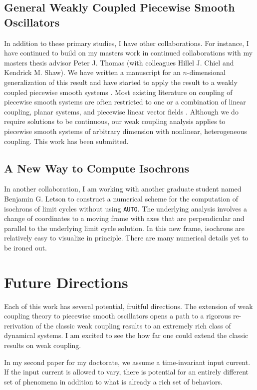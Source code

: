 \documentclass[a4paper,11pt]{article}
\begin{document}
\subsection{General Weakly Coupled Piecewise Smooth Oscillators}
In addition to these primary studies, I have other collaborations. For instance, I have continued to build on my masters work in continued collaborations with my masters thesis advisor Peter J. Thomas (with colleagues Hillel J. Chiel and Kendrick M. Shaw). We have written a manuscript for an $n$-dimensional generalization of this result and have started to apply the result to a weakly coupled piecewise smooth systems \cite{park2016infinitesimal}. Most existing literature on coupling of piecewise smooth systems are often restricted to one or a combination of linear coupling, planar systems, and piecewise linear vector fields \cite{coombes2016synchrony,izhikevich2000phase,coombes2012nonsmooth}. Although we do require solutions to be continuous, our weak coupling analysis applies to piecewise smooth systems of arbitrary dimension with nonlinear, heterogeneous coupling. This work has been submitted.

\subsection{A New Way to Compute Isochrons}
In another collaboration, I am working with another graduate student named Benjamin G. Letson to construct a numerical scheme for the computation of isochrons of limit cycles without using \texttt{AUTO}. The underlying analysis involves a change of coordinates to a moving frame with axes that are perpendicular and parallel to the underlying limit cycle solution. In this new frame, isochrons are relatively easy to visualize in principle. There are many numerical details yet to be ironed out.

\section{Future Directions}
Each of this work has several potential, fruitful directions. The extension of weak coupling theory to piecewise smooth oscillators opens a path to a rigorous re-rerivation of the classic weak coupling results to an extremely rich class of dynamical systems. I am excited to see the how far one could extend the classic results on weak coupling.

In my second paper for my doctorate, we assume a time-invariant input current. If the input current is allowed to vary, there is potential for an entirely different set of phenomena in addition to what is already a rich set of behaviors.
\end{document}
